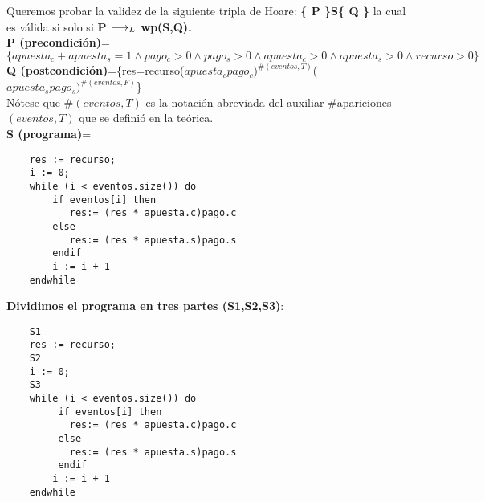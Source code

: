 \documentclass[10pt,a4paper]{article}
\begin{document}
\begin{flushleft}
Queremos probar  la validez de la siguiente tripla de Hoare:
\textbf{\{ P \}S\{ Q \}} la cual es válida si solo si \textbf{{P $\longrightarrow _L$ wp(S,Q)}.}\\                                  
\vspace{3mm}
\textbf{P (precondición)}=$\{ apuesta_c + apuesta_s =1 \wedge pago_c>0 \wedge pago_s>0 \wedge apuesta_c>0 \wedge apuesta_s>0 \wedge recurso>0\}$\\
\vspace{3mm}
\textbf{Q (postcondición)}=\{res=recurso($apuesta_cpago_c)^{\#(eventos,T)}$($apuesta_spago_s)^{\#(eventos,F)}$\}\\
\vspace{3mm}
Nótese que \#$(eventos, T)$ es la notación abreviada del auxiliar {\normalfont\ttfamily\#apariciones$(eventos, T)$} 
que se definió en la teórica. \\
\vspace{3mm}
\textbf{S (programa)}=
\begin{lstlisting}
	res := recurso;
	i := 0;
	while (i < eventos.size()) do
	    if eventos[i] then
		   res:= (res * apuesta.c)pago.c
		else
		   res:= (res * apuesta.s)pago.s
		endif
		i := i + 1
	endwhile
\end{lstlisting} 

\vspace{3mm}
\textbf{Dividimos el programa en tres partes (S1,S2,S3)}:\\
\begin{lstlisting}
	S1
	res := recurso;
	S2
	i := 0;
	S3
	while (i < eventos.size()) do
	     if eventos[i] then
		   res:= (res * apuesta.c)pago.c
		 else
		   res:= (res * apuesta.s)pago.s
		 endif
		i := i + 1
	endwhile
		\end{lstlisting} 


\end{flushleft}
\end{document}
